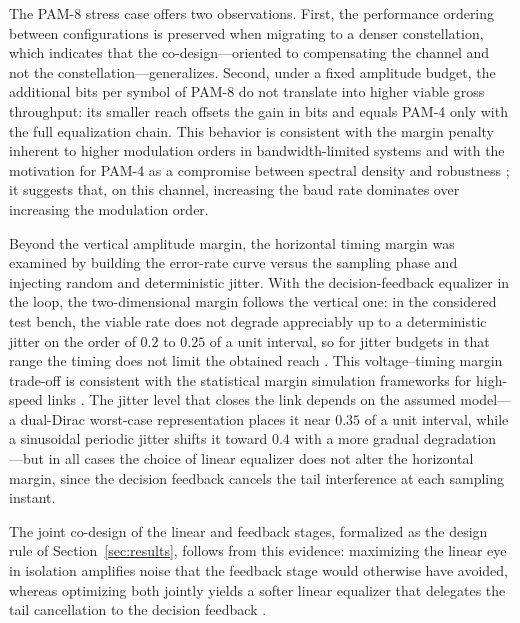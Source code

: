 \documentclass{ieeeaccess}
\begin{document}
The PAM-8 stress case offers two observations. First, the performance
ordering between configurations is preserved when migrating to a denser
constellation, which indicates that the co-design---oriented to compensating
the channel and not the constellation---generalizes. Second, under a fixed
amplitude budget, the additional bits per symbol of PAM-8 do not translate
into higher viable gross throughput: its smaller reach offsets the gain in
bits and equals PAM-4 only with the full equalization chain. This behavior is
consistent with the margin penalty inherent to higher modulation orders in
bandwidth-limited systems \cite{8963973} and with the motivation for PAM-4 as
a compromise between spectral density and robustness \cite{7964959}; it
suggests that, on this channel, increasing the baud rate dominates over
increasing the modulation order.

Beyond the vertical amplitude margin, the horizontal timing margin was
examined by building the error-rate curve versus the sampling phase and
injecting random and deterministic jitter. With the decision-feedback
equalizer in the loop, the two-dimensional margin follows the vertical one:
in the considered test bench, the viable rate does not degrade appreciably up
to a deterministic jitter on the order of $0.2$ to $0.25$ of a unit interval,
so for jitter budgets in that range the timing does not limit the obtained
reach \cite{7202856,10584882}. This voltage--timing margin trade-off is
consistent with the statistical margin simulation frameworks for high-speed
links \cite{4509472}. The jitter level that closes the link depends on the
assumed model---a dual-Dirac worst-case representation places it near $0.35$
of a unit interval, while a sinusoidal periodic jitter shifts it toward $0.4$
with a more gradual degradation \cite{805809,7571656}---but in all cases the
choice of linear equalizer does not alter the horizontal margin, since the
decision feedback cancels the tail interference at each sampling instant.

The joint co-design of the linear and feedback stages, formalized as the
design rule of Section~\ref{sec:results}, follows from this evidence:
maximizing the linear eye in isolation amplifies noise that the feedback
stage would otherwise have avoided, whereas optimizing both jointly yields a
softer linear equalizer that delegates the tail cancellation to the decision
feedback \cite{11169790,11346689}.
\end{document}
